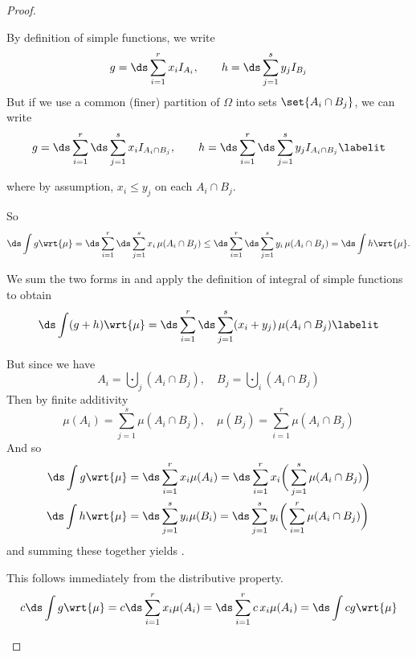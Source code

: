 \documentclass{article} %
\newif\ifActive
\begin{document}
\begin{proof}


\begin{alphabate}
\item 
\ifActive 
	\textbf{Workshop exercise:} Prove that the monotonicity property holds for integrals of simple functions.
\else 
	By definition of simple functions, we write \[g = \ds\sum_{i=1}^r x_i I_{A_i} ,\quad \quad h = \ds\sum_{j=1}^s y_j I_{B_j}  \]	
	But if we use a common (finer) partition of $\Omega$ into sets $\set{A_i \cap B_j}$, we can write
	\begin{align*}
	g = \ds\sum_{i=1}^r \ds\sum_{j=1}^s x_i I_{A_i \cap B_j} ,\quad \quad h = \ds\sum_{i=1}^r \ds\sum_{j=1}^s y_j I_{A_i \cap B_j}  
	\labelit \label{eqn:two_simple_functions_with_common_partition}
	\end{align*}
	
	where by assumption, $x_i \leq y_j$ on each $A_i \cap B_j$.	
		
	So 
	\begin{align*}
	\ds\int g \wrt{\mu}  = \ds\sum_{i=1}^r \ds\sum_{j=1}^s x_i \, \mu(A_i \cap B_j)  \leq \ds\sum_{i=1}^r \ds\sum_{j=1}^s y_i \, \mu(A_i \cap B_j) = \ds\int h \wrt{\mu}.
	\end{align*}
\fi 
\item We sum the two forms in  and apply the definition of integral of simple functions to obtain
\begin{align*}
\ds\int (g+h) \wrt{\mu} = \ds\sum_{i=1}^r \ds\sum_{j=1}^s (x_i + y_j) \, \mu(A_i \cap B_j)
\labelit \label{eqn:intermediate_result_addivity_of_simple_functions}
\end{align*}

But since we have 
\[A_i =\bigcupdot_j (A_i \cap B_j), \quad  B_j =\bigcupdot_i (A_i \cap B_j)\]
Then by finite additivity
\[\mu(A_i) =\sum_{j=1}^s \mu(A_i \cap B_j), \quad  \mu(B_j) =\sum_{i=1}^r \mu(A_i \cap B_j)\]
And so
\begin{align*}
\ds\int g \wrt{\mu} &= \ds\sum_{i=1}^r x_i \mu(A_i) = \ds\sum_{i=1}^r x_i \bigg(\sum_{j=1}^s \mu(A_i \cap B_j)\bigg) \\	
\ds\int h \wrt{\mu} &= \ds\sum_{j=1}^s y_i \mu(B_i) = \ds\sum_{j=1}^s y_i \bigg(\sum_{i=1}^r \mu(A_i \cap B_j)\bigg) \\	
\end{align*}
and summing these together yields .
\item This follows immediately from the distributive property.
\[ c \ds\int g \wrt{\mu} = c \ds\sum_{i=1}^r x_i \mu(A_i) =  \ds\sum_{i=1}^r c \, x_i \mu(A_i) = \ds\int cg \wrt{\mu} \]
\end{alphabate}

\end{proof}
\end{document}
